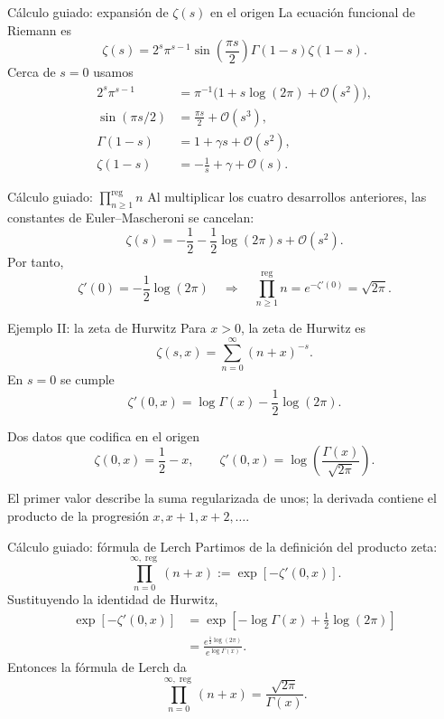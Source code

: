 \documentclass[aspectratio=169,11pt]{beamer}
\newcommand{\reg}{\operatorname{reg}}
\begin{document}
\begin{frame}{Cálculo guiado: expansión de $\zeta(s)$ en el origen}
  \small
  La ecuación funcional de Riemann es
  \[
    \zeta(s)=2^s\pi^{s-1}\sin\!\left(\frac{\pi s}{2}\right)
    \Gamma(1-s)\zeta(1-s).
  \]
  \pause
  Cerca de $s=0$ usamos
  \begin{align*}
    2^s\pi^{s-1}&=\pi^{-1}\bigl(1+s\log(2\pi)+\mathcal O(s^2)\bigr),\\
    \sin(\pi s/2)&=\frac{\pi s}{2}+\mathcal O(s^3),\\
    \Gamma(1-s)&=1+\gamma s+\mathcal O(s^2),\\
    \zeta(1-s)&=-\frac1s+\gamma+\mathcal O(s).
  \end{align*}
\end{frame}

\begin{frame}{Cálculo guiado: $\prod_{n\ge1}^{\reg}n$}
  Al multiplicar los cuatro desarrollos anteriores, las constantes de
  Euler--Mascheroni se cancelan:
  \pause
  \[
    \zeta(s)=-\frac12-\frac12\log(2\pi)s+\mathcal O(s^2).
  \]
  \pause
  Por tanto,
  \[
    \zeta'(0)=-\frac12\log(2\pi)
    \quad\Longrightarrow\quad
    \prod_{n\ge1}^{\reg}n=e^{-\zeta'(0)}=\sqrt{2\pi}.
  \]
\end{frame}

\begin{frame}[t]{Ejemplo II: la zeta de Hurwitz}
  \small
  Para $x>0$, la zeta de Hurwitz es
  \[
    \zeta(s,x)=\sum_{n=0}^{\infty}(n+x)^{-s}.
  \]
  \pause
  En $s=0$ se cumple
  \[
    \zeta'(0,x)=\log\Gamma(x)-\frac12\log(2\pi).
  \]
  \pause
  \begin{block}{Dos datos que codifica en el origen}
    \[
      \zeta(0,x)=\frac12-x,
      \qquad
      \zeta'(0,x)=\log\!\left(\frac{\Gamma(x)}{\sqrt{2\pi}}\right).
    \]
  \end{block}
  \pause
  El primer valor describe la suma regularizada de unos; la derivada contiene el
  producto de la progresión $x,x+1,x+2,\ldots$.
\end{frame}

\begin{frame}[t]{Cálculo guiado: fórmula de Lerch}
  \small
  Partimos de la definición del producto zeta:
  \[
    \prod_{n=0}^{\infty\!,\reg}(n+x):=\exp[-\zeta'(0,x)].
  \]
  \pause
  Sustituyendo la identidad de Hurwitz,
  \begin{align*}
    \exp[-\zeta'(0,x)]
      &=\exp\!\left[-\log\Gamma(x)+\frac12\log(2\pi)\right]\\
      &=\frac{e^{\frac12\log(2\pi)}}{e^{\log\Gamma(x)}}.
  \end{align*}
  \pause
  Entonces la fórmula de Lerch da
  \[
    \boxed{\prod_{n=0}^{\infty\!,\reg}(n+x)=\frac{\sqrt{2\pi}}{\Gamma(x)}}.
  \]
\end{frame}
\end{document}
